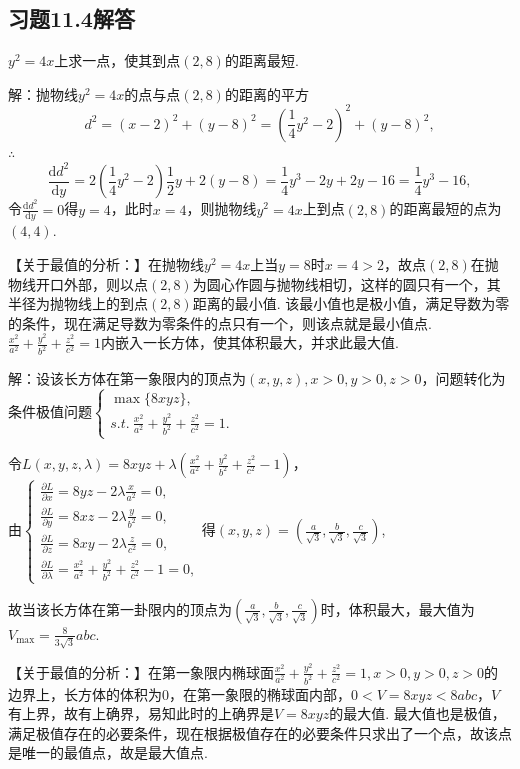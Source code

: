 \documentclass[12pt,UTF8]{ctexart}
\begin{document}
\subsection{习题11.4解答}
\begin{enumerate}
$y^2=4x$上求一点，使其到点$(2,8)$的距离最短.

解：抛物线$y^2=4x$的点与点$(2,8)$的距离的平方
\[d^2=(x-2)^2+(y-8)^2=(\frac14y^2-2)^2+(y-8)^2,\]
$\therefore$
\[\frac{\mathrm dd^2}{\mathrm dy}=2(\frac14y^2-2)\frac12y+2(y-8)=\frac14y^3-2y+2y-16=\frac14y^3-16,\]
令$\frac{\mathrm dd^2}{\mathrm dy}=0$得$y=4$，此时$x=4$，则抛物线$y^2=4x$上到点$(2,8)$的距离最短的点为$(4,4)$.

【关于最值的分析：】在抛物线$y^2=4x$上当$y=8$时$x=4>2$，故点$(2,8)$在抛物线开口外部，则以点$(2,8)$为圆心作圆与抛物线相切，这样的圆只有一个，其半径为抛物线上的到点$(2,8)$距离的最小值. 该最小值也是极小值，满足导数为零的条件，现在满足导数为零条件的点只有一个，则该点就是最小值点.
$\frac{x^2}{a^2}+\frac{y^2}{b^2}+\frac{z^2}{c^2}=1$内嵌入一长方体，使其体积最大，并求此最大值.

解：设该长方体在第一象限内的顶点为$(x,y,z),x>0,y>0,z>0$，问题转化为条件极值问题$\begin{cases}
\max\{8xyz\},\\
s.t.\ \frac{x^2}{a^2}+\frac{y^2}{b^2}+\frac{z^2}{c^2}=1.
\end{cases}$

令$L(x,y,z,\lambda)=8xyz+\lambda(\frac{x^2}{a^2}+\frac{y^2}{b^2}+\frac{z^2}{c^2}-1)$，\\
由$\begin{cases}
\frac{\partial L}{\partial x}=8yz-2\lambda\frac x{a^2}=0,\\
\frac{\partial L}{\partial y}=8xz-2\lambda\frac y{b^2}=0,\\
\frac{\partial L}{\partial z}=8xy-2\lambda\frac z{c^2}=0,\\
\frac{\partial L}{\partial\lambda}=\frac{x^2}{a^2}+\frac{y^2}{b^2}+\frac{z^2}{c^2}-1=0,
\end{cases}$得$(x,y,z)=(\frac a{\sqrt3},\frac b{\sqrt3},\frac c{\sqrt3})$,

故当该长方体在第一卦限内的顶点为$(\frac a{\sqrt3},\frac b{\sqrt3},\frac c{\sqrt3})$时，体积最大，最大值为$V_{\max}=\frac8{3\sqrt3}abc$.

【关于最值的分析：】在第一象限内椭球面$\frac{x^2}{a^2}+\frac{y^2}{b^2}+\frac{z^2}{c^2}=1,x>0,y>0,z>0$的边界上，长方体的体积为$0$，在第一象限的椭球面内部，$0<V=8xyz<8abc$，$V$有上界，故有上确界，易知此时的上确界是$V=8xyz$的最大值. 最大值也是极值，满足极值存在的必要条件，现在根据极值存在的必要条件只求出了一个点，故该点是唯一的最值点，故是最大值点. 


\end{enumerate}
\end{document}

